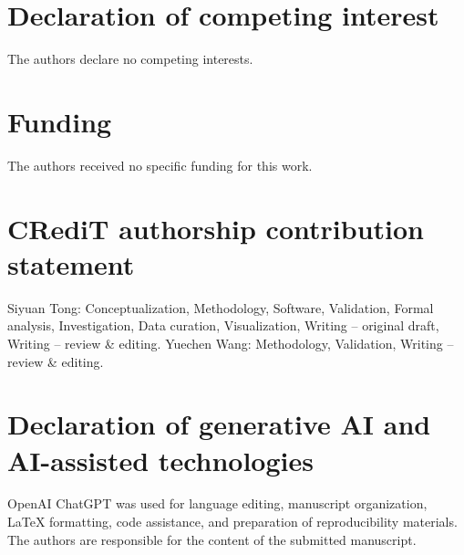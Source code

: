 \section*{Declaration of competing interest}
The authors declare no competing interests.
\section*{Funding}
The authors received no specific funding for this work.
\section*{CRediT authorship contribution statement}
\equalcontribution

Siyuan Tong: Conceptualization, Methodology, Software, Validation, Formal analysis, Investigation, Data curation, Visualization, Writing -- original draft, Writing -- review \& editing. Yuechen Wang: Methodology, Validation, Writing -- review \& editing.
\section*{Declaration of generative AI and AI-assisted technologies}
OpenAI ChatGPT was used for language editing, manuscript organization, LaTeX formatting, code assistance, and preparation of reproducibility materials. The authors are responsible for the content of the submitted manuscript.
